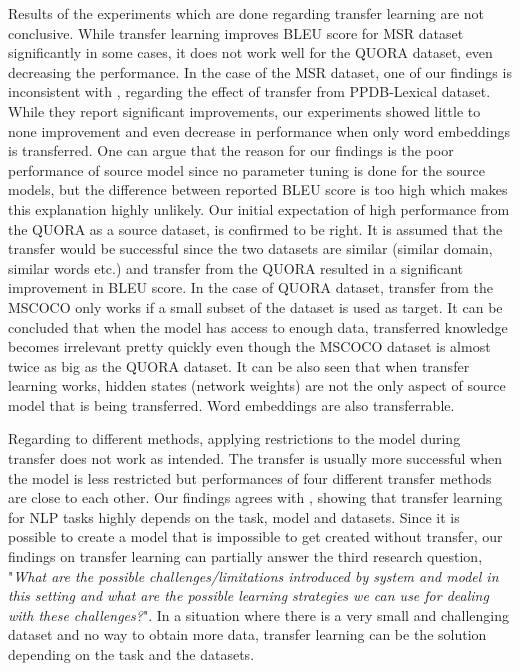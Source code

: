 Results of the experiments which are done regarding transfer learning are not conclusive. While transfer learning improves BLEU score for MSR dataset significantly in some cases, it does not work well for the QUORA dataset, even decreasing the performance. In the case of the MSR dataset, one of our findings is inconsistent with \cite{brad}, regarding the effect of transfer from PPDB-Lexical dataset. While they report significant improvements, our experiments showed little to none improvement and even decrease in performance when only word embeddings is transferred. One can argue that the reason for our findings is the poor performance of source model since no parameter tuning is done for the source models, but the difference between reported BLEU score is too high which makes this explanation highly unlikely. Our initial expectation of high performance from the QUORA as a source dataset, is confirmed to be right. It is assumed that the transfer would be successful since the two datasets are similar (similar domain, similar words etc.) and transfer from the QUORA resulted in a significant improvement in BLEU score. In the case of QUORA dataset, transfer from the MSCOCO only works if a small subset of the dataset is used as target. It can be concluded that when the model has access to enough data, transferred knowledge becomes irrelevant pretty quickly even though the MSCOCO dataset is almost twice as big as the QUORA dataset. It can be also seen that when transfer learning works, hidden states (network weights) are not the only aspect of source model that is being transferred. Word embeddings are also transferrable. 

Regarding to different methods, applying restrictions to the model during transfer does not work as intended. The transfer is usually more successful when the model is less restricted but performances of four different transfer methods are close to each other. Our findings agrees with \cite{mou}, showing that transfer learning for NLP tasks highly depends on the task, model and datasets. Since it is possible to create a model that is impossible to get created without transfer, our findings on transfer learning can partially answer the third research question, "\textit{What are the possible challenges/limitations introduced by system and model in this setting and what are the possible learning strategies we can use for dealing with these challenges?}". In a situation where there is a very small and challenging dataset and no way to obtain more data, transfer learning can be the solution depending on the task and the datasets.

